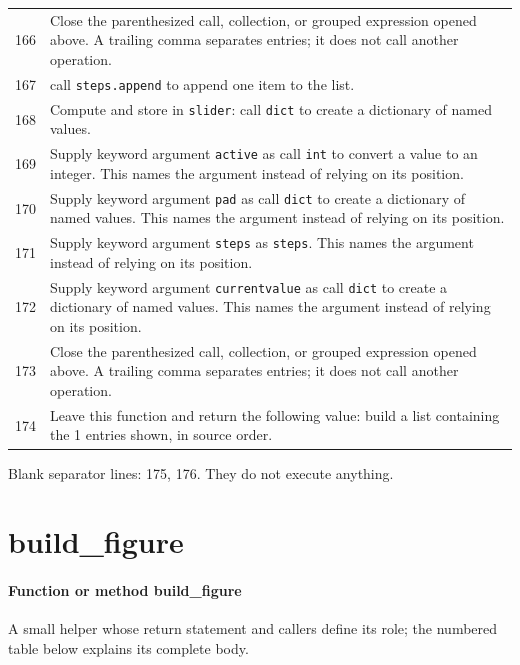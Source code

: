 \documentclass[11pt,a4paper]{book}
\begin{document}
\begin{longtable}{r p{}}
166 & Close the parenthesized call, collection, or grouped expression opened above. A trailing comma separates entries; it does not call another operation. \\

167 & call \texttt{steps.append} to append one item to the list. \\

168 & Compute and store in \texttt{slider}: call \texttt{dict} to create a dictionary of named values.  \\

169 & Supply keyword argument \texttt{active} as call \texttt{int} to convert a value to an integer. This names the argument instead of relying on its position. \\

170 & Supply keyword argument \texttt{pad} as call \texttt{dict} to create a dictionary of named values. This names the argument instead of relying on its position. \\

171 & Supply keyword argument \texttt{steps} as \texttt{steps}. This names the argument instead of relying on its position. \\

172 & Supply keyword argument \texttt{currentvalue} as call \texttt{dict} to create a dictionary of named values. This names the argument instead of relying on its position. \\

173 & Close the parenthesized call, collection, or grouped expression opened above. A trailing comma separates entries; it does not call another operation. \\

174 & Leave this function and return the following value: build a list containing the 1 entries shown, in source order. \\

\end{longtable}

Blank separator lines: 175, 176. They do not execute anything.

\section{build\_figure}

\paragraph{Function or method build\_figure}
A small helper whose return statement and callers define its role; the numbered table below explains its complete body.
\end{document}
